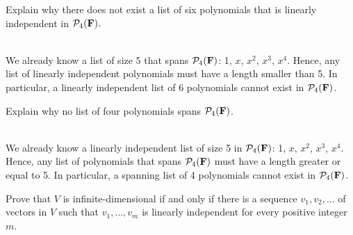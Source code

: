 \begin{exercise}
    Explain why there does not exist a list of six polynomials that is linearly independent in $\mathcal{P}_4(\mathbf{F}).$ \\
\end{exercise}

\begin{solution}
    \\ We already know a list of size 5 that spans $\mathcal{P}_4(\mathbf{F})$: 1, $x$, $x^2$, $x^3$, $x^4$. Hence, any list of linearly independent polynomials must have a length smaller than 5. In particular, a linearly independent list of 6 polynomials cannot exist in $\mathcal{P}_4(\mathbf{F})$.\\
\end{solution}

\begin{exercise}
    Explain why no list of four polynomials spans $\mathcal{P}_4(\mathbf{F})$. \\
\end{exercise}

\begin{solution}
    \\ We already know a linearly independent list of size 5 in $\mathcal{P}_4(\mathbf{F})$: 1, $x$, $x^2$, $x^3$, $x^4$. Hence, any list of polynomials that spans $\mathcal{P}_4(\mathbf{F})$ must have a length greater or equal to 5. In particular, a spanning list of 4 polynomials cannot exist in $\mathcal{P}_4(\mathbf{F})$.\\
\end{solution}

\begin{exercise}
    Prove that $V$ is infinite-dimensional if and only if there is a sequence $v_1, v_2, ...$ of vectors in $V$ such that $v_1, ..., v_m$ is linearly independent for every positive integer $m$. \\
\end{exercise}

